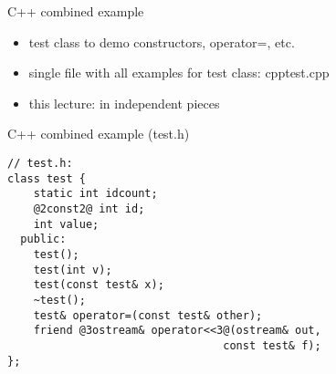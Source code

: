 \begin{frame}[fragile,label=overExOver]{C++ combined example}
    \begin{itemize}
    \item test class to demo constructors, operator=, etc.
    \item single file with all examples for test class: cpptest.cpp
    \item this lecture: in independent pieces
    \end{itemize}
\end{frame}


\begin{frame}[fragile,label=overEx]{C++ combined example (test.h)}
\begin{lstlisting}
// test.h:
class test {
    static int idcount;
    @2const2@ int id;
    int value;
  public:
    test();
    test(int v);
    test(const test& x);
    ~test();
    test& operator=(const test& other);
    friend @3ostream& operator<<3@(ostream& out,
                                 const test& f);
};
\end{lstlisting}
\end{frame}

